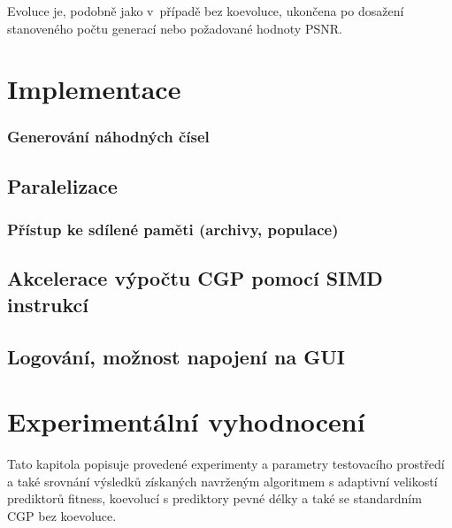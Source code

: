 Evoluce je, podobně jako v~případě bez koevoluce, ukončena po dosažení stanoveného počtu generací nebo požadované hodnoty PSNR.


\chapter{Implementace}
\label{chImplementation}


\subsection{Generování náhodných čísel}

\section{Paralelizace}




\subsection{Přístup ke sdílené paměti (archivy, populace)}


\section{Akcelerace výpočtu CGP pomocí SIMD instrukcí}


\section{Logování, možnost napojení na GUI}


\chapter{Experimentální vyhodnocení}
\label{chExperiments}

Tato kapitola popisuje provedené experimenty a parametry testovacího prostředí a také srovnání výsledků získaných navrženým algoritmem s adaptivní velikostí prediktorů fitness, koevolucí s prediktory pevné délky a také se standardním CGP bez koevoluce.


